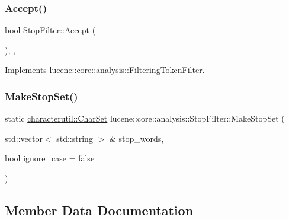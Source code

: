 \subsubsection{\texorpdfstring{Accept()}{Accept()}}
{\footnotesize\ttfamily bool Stop\+Filter\+::\+Accept (\begin{DoxyParamCaption}{ }\end{DoxyParamCaption})\hspace{0.3cm}{\ttfamily [override]}, {\ttfamily [protected]}, {\ttfamily [virtual]}}



Implements \mbox{\hyperlink{classlucene_1_1core_1_1analysis_1_1FilteringTokenFilter_a4a2fb2dd2d3bda8eb6cd0d5b14a4ab92}{lucene\+::core\+::analysis\+::\+Filtering\+Token\+Filter}}.

\mbox{\label{classlucene_1_1core_1_1analysis_1_1StopFilter_ac27f79322c5118e5ac408e250203e17e}} 
\subsubsection{\texorpdfstring{Make\+Stop\+Set()}{MakeStopSet()}}
{\footnotesize\ttfamily static \mbox{\hyperlink{classlucene_1_1core_1_1analysis_1_1characterutil_1_1CharSet}{characterutil\+::\+Char\+Set}} lucene\+::core\+::analysis\+::\+Stop\+Filter\+::\+Make\+Stop\+Set (\begin{DoxyParamCaption}\item[{std\+::vector$<$ std\+::string $>$ \&}]{stop\+\_\+words,  }\item[{bool}]{ignore\+\_\+case = {\ttfamily false} }\end{DoxyParamCaption})\hspace{0.3cm}{\ttfamily [static]}}



\subsection{Member Data Documentation}
\mbox{\label{classlucene_1_1core_1_1analysis_1_1StopFilter_ace188f785bcebdc0f18a73116da1afd0}} 
